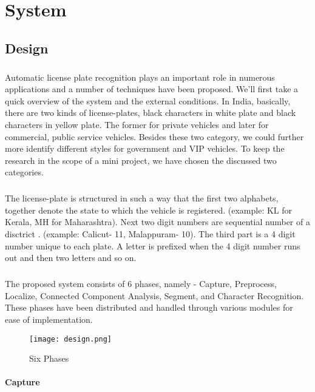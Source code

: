 \documentclass[a4paper,10pt]{iesreport}
\begin{document}
\chapter{System}
\section{Design}
\paragraph*{}
Automatic license plate recognition  plays an important role in numerous applications and a number of techniques have been proposed. We'll first take a quick overview of the system and the external conditions. In India, basically, there are two kinds of license-plates, black characters in white plate and black characters in yellow plate. The former for private vehicles and later for commercial, public service vehicles. Besides these two category, we could further more identify different styles for government and VIP vehicles. To keep the research in the scope of a mini project, we have chosen the discussed two categories.
\paragraph*{}
The license-plate is structured in such a way that the first two alphabets, together denote the state to which the vehicle is registered. (example: KL for Kerala, MH for Maharashtra).
Next two digit numbers are sequential number of a disctrict \cite{WK}. (example: Calicut- 11, Malappuram- 10). The third part is a 4 digit number unique to each plate. A letter is prefixed when the 4 digit number runs out and then two letters and so on.
\cite{LW}
\paragraph*{}
The proposed system consists of 6 phases, namely -  Capture, Preprocess, Localize, Connected Component Analysis, Segment, and Character Recognition. These phases have been distributed and handled through various modules for ease of implementation.
 \begin{figure}[h]
 \centering
\texttt{[image: design.png]}
 \caption{Six Phases}
 \label{fig:phase}
\end{figure}
\newpage
\subsubsection{Capture}
\end{document}
